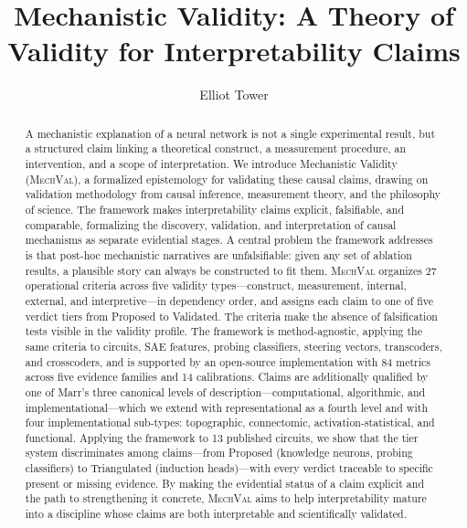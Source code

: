 \documentclass[10pt]{article}
\title{Mechanistic Validity: A Theory of Validity for Interpretability Claims}
\author[1]{Elliot Tower}
\affil[1]{Independent Researcher, \texttt{elliot@elliottower.com}}
\date{}
\newcommand{\mechval}{\textsc{MechVal}}
\begin{document}
\maketitle

\begin{abstract}
A mechanistic explanation of a neural network is not a single experimental result, but a structured claim linking a theoretical construct, a measurement procedure, an intervention, and a scope of interpretation. We introduce Mechanistic Validity (\mechval{}), a formalized epistemology for validating these causal claims, drawing on validation methodology from causal inference, measurement theory, and the philosophy of science. The framework makes interpretability claims explicit, falsifiable, and comparable, formalizing the discovery, validation, and interpretation of causal mechanisms as separate evidential stages. A central problem the framework addresses is that post-hoc mechanistic narratives are unfalsifiable: given any set of ablation results, a plausible story can always be constructed to fit them. \mechval{} organizes 27 operational criteria across five validity types---construct, measurement, internal, external, and interpretive---in dependency order, and assigns each claim to one of five verdict tiers from Proposed to Validated. The criteria make the absence of falsification tests visible in the validity profile. The framework is method-agnostic, applying the same criteria to circuits, SAE features, probing classifiers, steering vectors, transcoders, and crosscoders, and is supported by an open-source implementation with 84 metrics across five evidence families and 14 calibrations. Claims are additionally qualified by one of Marr's \citeyearpar{marr1982vision} three canonical levels of description---computational, algorithmic, and implementational---which we extend with representational as a fourth level and with four implementational sub-types: topographic, connectomic, activation-statistical, and functional. Applying the framework to 13 published circuits, we show that the tier system discriminates among claims---from Proposed (knowledge neurons, probing classifiers) to Triangulated (induction heads)---with every verdict traceable to specific present or missing evidence. By making the evidential status of a claim explicit and the path to strengthening it concrete, \mechval{} aims to help interpretability mature into a discipline whose claims are both interpretable and scientifically validated.
\end{abstract}
\end{document}
